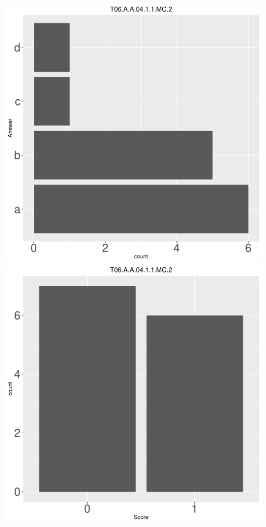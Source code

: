 \documentclass[12pt,english,nohyper]{tufte-handout}\usepackage[]{graphicx}\usepackage[]{color}
\begin{document}
\begin{center} \includegraphics[width=.45\linewidth]{Topic06_AB_2_answer} \includegraphics[width=.45\linewidth]{Topic06_AB_2_score} \end{center} 
\end{document}

